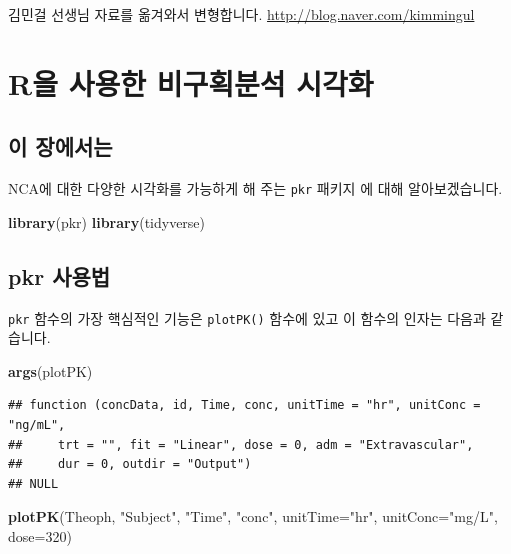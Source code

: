 \documentclass[]{krantz}
\makeatletter
\newenvironment{Shaded}{\begin{snugshade}}{\end{snugshade}}
\newcommand{\KeywordTok}[1]{\textcolor[rgb]{0.13,0.29,0.53}{\textbf{#1}}}
\newcommand{\DataTypeTok}[1]{\textcolor[rgb]{0.13,0.29,0.53}{#1}}
\newcommand{\DecValTok}[1]{\textcolor[rgb]{0.00,0.00,0.81}{#1}}
\newcommand{\StringTok}[1]{\textcolor[rgb]{0.31,0.60,0.02}{#1}}
\newcommand{\NormalTok}[1]{#1}
\newenvironment{kframe}{%
\medskip{}
\setlength{\fboxsep}{.8em}
 \def\at@end@of@kframe{}%
 \ifinner\ifhmode%
  \def\at@end@of@kframe{\end{minipage}}%
  \begin{minipage}{\columnwidth}%
 \fi\fi%
 \def\FrameCommand##1{\hskip\@totalleftmargin \hskip-\fboxsep
 \colorbox{shadecolor}{##1}\hskip-\fboxsep
     \hskip-\linewidth \hskip-\@totalleftmargin \hskip\columnwidth}%
 \MakeFramed {\advance\hsize-\width
   \@totalleftmargin\z@ \linewidth\hsize
   \@setminipage}}%
 {\par\unskip\endMakeFramed%
 \at@end@of@kframe}
\renewenvironment{Shaded}{\begin{kframe}}{\end{kframe}}
\theoremstyle{definition}
\theoremstyle{definition}
\theoremstyle{definition}
\theoremstyle{remark}
\makeatother
\begin{document}
김민걸 선생님 자료를 옮겨와서 변형합니다.
\url{http://blog.naver.com/kimmingul}

\section{R을 사용한 비구획분석 시각화}\label{pkr}

\subsection{이 장에서는}\label{summary-pkr}

NCA에 대한 다양한 시각화를 가능하게 해 주는 \texttt{pkr} 패키지
\citep{R-pkr} 에 대해 알아보겠습니다.

\begin{Shaded}
\begin{Highlighting}[]
\KeywordTok{library}\NormalTok{(pkr)}
\KeywordTok{library}\NormalTok{(tidyverse)}
\end{Highlighting}
\end{Shaded}

\subsection{pkr 사용법}\label{pkr-}

\texttt{pkr} 함수의 가장 핵심적인 기능은 \texttt{plotPK()} 함수에 있고
이 함수의 인자는 다음과 같습니다.

\begin{Shaded}
\begin{Highlighting}[]
\KeywordTok{args}\NormalTok{(plotPK)}
\end{Highlighting}
\end{Shaded}

\begin{verbatim}
## function (concData, id, Time, conc, unitTime = "hr", unitConc = "ng/mL", 
##     trt = "", fit = "Linear", dose = 0, adm = "Extravascular", 
##     dur = 0, outdir = "Output") 
## NULL
\end{verbatim}

\begin{Shaded}
\begin{Highlighting}[]
\KeywordTok{plotPK}\NormalTok{(Theoph, }\StringTok{"Subject"}\NormalTok{, }\StringTok{"Time"}\NormalTok{, }\StringTok{"conc"}\NormalTok{, }\DataTypeTok{unitTime=}\StringTok{"hr"}\NormalTok{, }\DataTypeTok{unitConc=}\StringTok{"mg/L"}\NormalTok{, }\DataTypeTok{dose=}\DecValTok{320}\NormalTok{)}
\end{Highlighting}
\end{Shaded}
\end{document}
